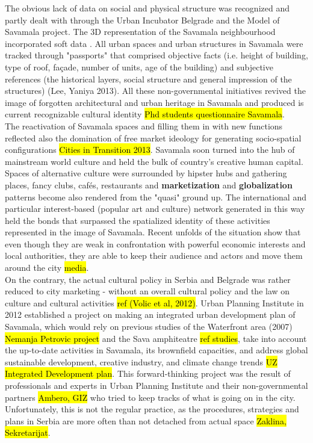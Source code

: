 \documentclass[11pt]{report}
\begin{document}
The obvious lack of data on social and physical structure was recognized and partly dealt with through the Urban Incubator Belgrade and the Model of Savamala project.
The 3D representation of the Savamala neighbourhood incorporated soft data \cite{Cvetinovic et al 2013}.
All urban spaces and urban structures in Savamala were tracked through "passports" that comprised objective facts (i.e. height of building, type of roof, façade, number of units, age of the building) and subjective references (the historical layers, social structure and general impression of the structures) (Lee, Yaniya 2013).
All these non-governmental initiatives revived the image of forgotten architectural and urban heritage in Savamala and produced is current recognizable cultural identity \hl{Phd students questionnaire Savamala}.
\\
The reactivation of Savamala spaces and filling them in with new functions reflected also the domination of free market ideology for generating socio-spatial configurations \hl{Cities in Transition 2013}.
Savamala soon turned into the hub of mainstream world culture  and held the bulk of country's creative human capital.
Spaces of alternative culture were surrounded by hipster hubs and gathering places, fancy clubs, cafés, restaurants and \textbf{marketization} and \textbf{globalization} patterns become also rendered from the "quasi" ground up.
The international and particular interest-based (popular art and culture) network generated in this way held the bonds that surpassed the spatialized identity of these activities represented in the image of Savamala. Recent unfolds of the situation show that even though they are weak in confrontation with powerful economic interests and local authorities, they are able to keep their audience and actors and move them around the city \hl{media}.
\\
On the contrary, the actual cultural policy in Serbia and Belgrade was rather reduced to city marketing - without an overall cultural policy and the law on culture and cultural activities \hl{ref (Volic et al, 2012)}.
Urban Planning Institute in 2012 established a project on making an integrated urban development plan of Savamala, which would rely on previous studies of the Waterfront area (2007) \hl{Nemanja Petrovic project} and the Sava amphiteatre \hl{ref studies}, take into account the up-to-date activities in Savamala, its brownfield capacities, and address global sustainable development, creative industry, and climate change trends \hl{UZ Integrated Development plan}.
This forward-thinking project was the result of professionals and experts in Urban Planning Institute and their non-governmental partners \hl{Ambero, GIZ} who tried to keep tracks of what is going on in the city. Unfortunately, this is not the regular practice, as the procedures, strategies and plans in Serbia are more often than not detached from actual space \hl{Zaklina, Sekretarijat}.
\end{document}
